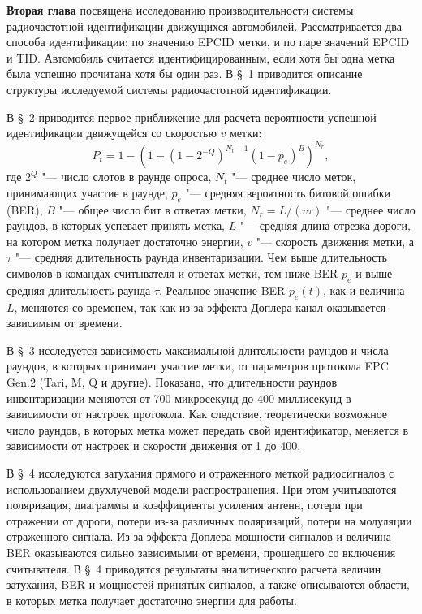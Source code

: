 

\textbf{Вторая глава} посвящена исследованию производительности системы радиочастотной идентификации движущихся автомобилей. Рассматривается два способа идентификации: по значению EPCID метки, и по паре значений EPCID и TID. Автомобиль считается идентифицированным, если хотя бы одна метка была успешно прочитана хотя бы один раз. В \S~1 приводится описание структуры исследуемой системы радиочастотной идентификации.

В \S~2 приводится первое приближение для расчета вероятности успешной идентификации движущейся со скоростью $v$ метки:
\[
P_t = 1 - \left( 1 - (1 - 2^{-Q})^{N_t-1} (1 - p_e)^B \right)^{N_r},
\]
где $2^Q$ "--- число слотов в раунде опроса, $N_t$ "--- среднее число меток, принимающих участие в раунде, $p_e$ "--- средняя вероятность битовой ошибки (BER), $B$ "--- общее число бит в ответах метки, $N_r = L / (v \tau)$ "--- среднее число раундов, в которых успевает принять метка, $L$ "--- средняя длина отрезка дороги, на котором метка получает достаточно энергии, $v$ "--- скорость движения метки, а $\tau$ "--- средняя длительность раунда инвентаризации. Чем выше длительность символов в командах считывателя и ответах метки, тем ниже BER $p_e$ и выше средняя длительность раунда $\tau$. Реальное значение BER $p_e(t)$, как и величина $L$, меняются со временем, так как из-за эффекта Доплера канал оказывается зависимым от времени.

В \S~3 исследуется зависимость максимальной длительности раундов и числа раундов, в которых принимает участие метки, от параметров протокола EPC Gen.2 (Tari, M, Q и другие). Показано, что длительности раундов инвентаризации меняются от 700 микросекунд до 400 миллисекунд в зависимости от настроек протокола. Как следствие, теоретически возможное число раундов, в которых метка может передать свой идентификатор, меняется в зависимости от настроек и скорости движения от 1 до 400.

В \S~4 исследуются затухания прямого и отраженного меткой радиосигналов с использованием двухлучевой модели распространения. При этом учитываются поляризация, диаграммы и коэффициенты усиления антенн, потери при отражении от дороги, потери из-за различных поляризаций, потери на модуляции отраженного сигнала. Из-за эффекта Доплера мощности сигналов и величина BER оказываются сильно зависимыми от времени, прошедшего со включения считывателя. В \S~4 приводятся результаты аналитического расчета величин затухания, BER и мощностей принятых сигналов, а также описываются области, в которых метка получает достаточно энергии для работы.

